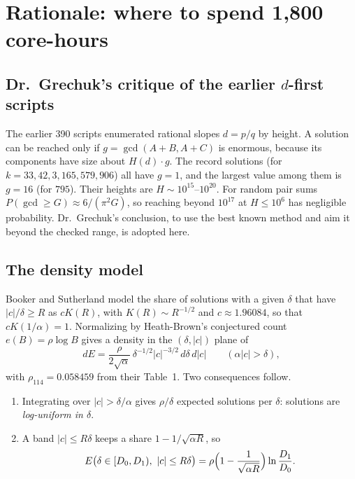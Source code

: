 \documentclass[11pt,a4paper]{article}
\theoremstyle{remark}
\begin{document}
\section{Rationale: where to spend 1,800 core-hours}\label{sec:rationale}

\subsection{Dr.\ Grechuk's critique of the earlier \texorpdfstring{$d$}{d}-first scripts}
The earlier 390 scripts enumerated rational slopes $d=p/q$ by height. A solution can be
reached only if $g=\gcd(A+B,A+C)$ is enormous, because its components have size about
$H(d)\cdot g$. The record solutions (for $k=33,42,3,165,579,906$) all have $g=1$, and the
largest value among them is $g=16$ (for $795$). Their heights are $H\sim10^{15}$--$10^{20}$.
For random pair sums $P(\gcd\ge G)\approx 6/(\pi^2G)$, so reaching beyond $10^{17}$ at
$H\le10^6$ has negligible probability. Dr.\ Grechuk's conclusion, to use the best known
method and aim it beyond the checked range, is adopted here.

\subsection{The density model}
Booker and Sutherland \cite[\S2.2]{BS} model the share of solutions with a given $\delta$ that
have $|c|/\delta\ge R$ as $cK(R)$, with $K(R)\sim R^{-1/2}$ and $c\approx1.96084$, so that
$cK(1/\alpha)=1$. Normalizing by Heath-Brown's conjectured count $e(B)=\rho\log B$ gives a
density in the $(\delta,|c|)$ plane of
\[
  dE=\frac{\rho}{2\sqrt\alpha}\,\delta^{-1/2}|c|^{-3/2}\,d\delta\,d|c|\qquad(\alpha|c|>\delta),
\]
with $\rho_{114}=0.058459$ from their Table~1. Two consequences follow.
\begin{enumerate}[leftmargin=*]
  \item Integrating over $|c|>\delta/\alpha$ gives $\rho/\delta$ expected solutions per
  $\delta$: solutions are \emph{log-uniform in $\delta$}.
  \item A band $|c|\le R\delta$ keeps a share $1-1/\sqrt{\alpha R}$, so
  \begin{equation}\label{eq:yield}
    E\bigl(\delta\in[D_0,D_1),\ |c|\le R\delta\bigr)=\rho\Bigl(1-\frac1{\sqrt{\alpha R}}\Bigr)\ln\frac{D_1}{D_0}.
  \end{equation}
\end{enumerate}
\end{document}
